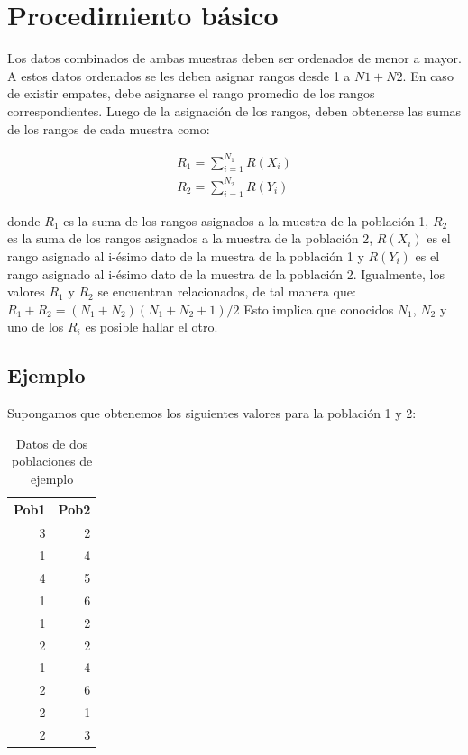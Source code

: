 \documentclass[]{book}
\theoremstyle{definition}
\theoremstyle{definition}
\theoremstyle{definition}
\theoremstyle{remark}
\begin{document}
\hypertarget{np-algoritmo}{%
\section{Procedimiento básico}\label{np-algoritmo}}

Los datos combinados de ambas muestras deben ser ordenados de menor a
mayor. A estos datos ordenados se les deben asignar rangos desde 1 a
\(N1+N2\). En caso de existir empates, debe asignarse el rango promedio
de los rangos correspondientes. Luego de la asignación de los rangos,
deben obtenerse las sumas de los rangos de cada muestra como:

\[
\begin{matrix}
R_1=\sum_{i=1}^{N_1}R(X_i)\\
R_2=\sum_{i=1}^{N_2}R(Y_i)
\end{matrix}
\]

donde \(R_1\) es la suma de los rangos asignados a la muestra de la
población 1, \(R_2\) es la suma de los rangos asignados a la muestra de
la población 2, \(R(X_i)\) es el rango asignado al i-ésimo dato de la
muestra de la población 1 y \(R(Y_i)\) es el rango asignado al i-ésimo
dato de la muestra de la población 2. Igualmente, los valores \(R_1\) y
\(R_2\) se encuentran relacionados, de tal manera que:
\(R_1+R_2=(N_1+N_2)(N_1+N_2+1)/2\) Esto implica que conocidos \(N_1\),
\(N_2\) y uno de los \(R_i\) es posible hallar el otro.

\hypertarget{ejemplo}{%
\subsection{Ejemplo}\label{ejemplo}}

Supongamos que obtenemos los siguientes valores para la población 1 y 2:

\begin{table}

\caption{\label{tab:ejemplo-ranking}Datos de dos poblaciones de ejemplo}
\centering
\begin{tabular}[t]{r|r}
\hline
Pob1 & Pob2\\
\hline
3 & 2\\
\hline
1 & 4\\
\hline
4 & 5\\
\hline
1 & 6\\
\hline
1 & 2\\
\hline
2 & 2\\
\hline
1 & 4\\
\hline
2 & 6\\
\hline
2 & 1\\
\hline
2 & 3\\
\hline
\end{tabular}
\end{table}
\end{document}
